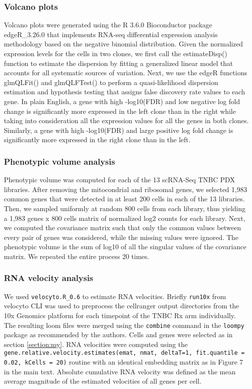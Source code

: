 \documentclass{article}
\begin{document}
\subsubsection{Volcano plots}
Volcano plots were generated using the R 3.6.0 Bioconductor package edgeR\_3.26.0 that implements RNA-seq differential expression analysis methodology based on the negative binomial distribution. Given the normalized expression levels for the cells in two clones, we first call the estimateDisp() function to estimate the dispersion by fitting a generalized linear model that accounts for all systematic sources of variation. Next, we use the edgeR functions glmQLFit() and glmQLFTest() to perform a quasi-likelihood dispersion estimation and hypothesis testing that assigns false discovery rate values to each gene. In plain English, a gene with high -log10(FDR) and low negative log fold change is significantly more expressed in the left clone than in the right while taking into consideration all the expression values for all the genes in both clones. Similarly, a gene with high -log10(FDR) and large positive log fold change is significantly more expressed in the right clone than in the left. 


\subsubsection{Phenotypic volume analysis}
\label{sec:phvolume}

Phenotypic volume \cite{azizi2018single} was computed for each of the 13 scRNA-Seq TNBC PDX libraries. After removing the mitocondrial and ribosomal genes, we selected 1,983 common genes that were detected in at least 200 cells in each of the 13 libraries. Then, we sampled uniformly at random 800 cells from each library, thus yielding a 1,983 genes x 800 cells matrix of normalized log2 counts for each library. Next, we computed the  covariance matrix such that only the common values between every pair of genes was considered, while the missing values were ignored. The phenotypic volume is the sum of log10 of all the singular values of the covariance matrix. We repeated the entire process 20 times.


\subsubsection{RNA velocity analysis}
We used \verb|velocyto.R_0.6| \cite{la2018rna} to estimate RNA velocities. 
Briefly  \verb|run10x| from velocyto CLI was used to preprocess the cellranger output directories from the 10x Genomics platform for each timepoint of the TNBC Rx arm individually. 
The resulting loom files were merged using the \verb|combine| command in the \verb|loompy| package as recommended by the authors. 
Cells and genes were selected as in section \ref{section:my}. 
RNA velocities were computed using the \verb|gene.relative.velocity.estimates(emat, nmat, deltaT=1, fit.quantile = 0.02, kCells = 20)| routine with an identical embedding matrix as in Figure 7 in the main text. 
Absolute cumulative RNA velocity was defined as the mean average magnitude of the estimated velocities of all genes per cell. 
\end{document}
